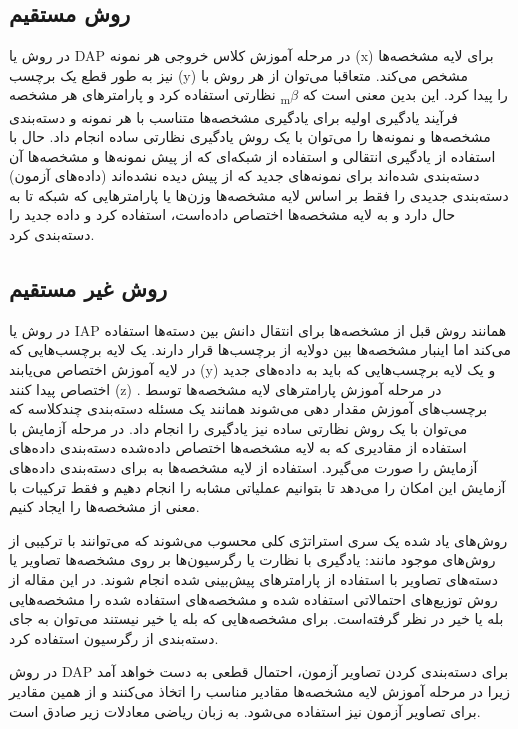 \subsection{روش مستقیم}
در روش 
یا DAP در مرحله آموزش کلاس خروجی هر نمونه (x) برای لایه مشخصه‌ها نیز به طور قطع یک برچسب (y) مشخص می‌کند. متعاقبا می‌توان از هر روش با نظارتی استفاده کرد و  پارامتر‌های هر مشخصه‌ 
\textsubscript{m}$\beta$ 
را پیدا کرد. این بدین معنی است که فرآیند یادگیری اولیه برای یادگیری مشخصه‌ها متناسب با هر نمونه و دسته‌بندی مشخصه‌ها و نمونه‌ها را می‌توان با یک روش یادگیری نظارتی ساده انجام داد. حال با استفاده از یادگیری انتقالی و استفاده از شبکه‌ای که از پیش نمونه‌ها و مشخصه‌ها آن دسته‌بندی شده‌اند برای نمونه‌های جدید   که از پیش دیده نشده‌اند (داده‌های آزمون) دسته‌بندی جدیدی را فقط بر اساس لایه مشخصه‌ها وزن‌ها یا پارامتر‌هایی که شبکه تا به حال دارد و به لایه مشخصه‌ها اختصاص داده‌است، استفاده کرد و داده جدید را دسته‌بندی کرد.

\subsection{روش غیر مستقیم}
در روش 
یا IAP همانند روش قبل از مشخصه‌ها برای انتقال دانش بین دسته‌ها استفاده می‌کند اما اینبار مشخصه‌ها بین دولایه از برچسب‌ها قرار دارند. یک لایه برچسب‌هایی که در لایه آموزش اختصاص می‌یابند (y) و یک لایه برچسب‌هایی که باید به داده‌های جدید اختصاص پیدا کنند (z) . در مرحله آموزش پارامتر‌های لایه مشخصه‌ها توسط برچسب‌های آموزش مقدار دهی می‌شوند همانند یک مسئله دسته‌بندی چند‌کلاسه که می‌توان با یک روش نظارتی ساده نیز یادگیری را انجام داد. در مرحله آزمایش با استفاده از مقادیری که به لایه مشخصه‌ها اختصاص داده‌شده دسته‌بندی داده‌های آزمایش را صورت می‌گیرد. استفاده از لایه مشخصه‌ها به برای دسته‌بندی داده‌های آزمایش این امکان را می‌دهد تا بتوانیم عملیاتی مشابه 
را انجام دهیم و فقط ترکیبات با معنی از مشخصه‌ها را ایجاد کنیم.

روش‌های یاد شده یک سری استراتژی کلی محسوب می‌شوند که می‌توانند با ترکیبی از روش‌‌های موجود مانند: یادگیری با نظارت یا رگرسیون‌ها  بر روی مشخصه‌ها تصاویر یا دسته‌های تصاویر با استفاده از پارامتر‌های پیش‌بینی شده انجام شوند. در این مقاله از روش توزیع‌های احتمالاتی استفاده شده و مشخصه‌های استفاده شده را مشخصه‌هایی بله یا خیر در نظر گرفته‌است. برای مشخصه‌هایی که بله یا خیر نیستند می‌توان به جای دسته‌بندی از رگرسیون استفاده کرد.

در روش DAP برای دسته‌بندی کردن تصاویر آزمون، احتمال قطعی به دست خواهد آمد زیرا در مرحله آموزش لایه مشخصه‌ها مقادیر مناسب را اتخاذ می‌کنند و از همین مقادیر برای تصاویر آزمون نیز استفاده می‌شود. به زبان ریاضی معادلات زیر صادق است.


